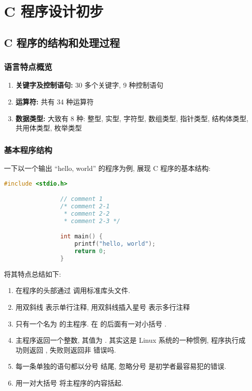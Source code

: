 \chapter{C 程序设计初步}
\section{C 程序的结构和处理过程}
    \subsection{语言特点概览}
        \begin{enumerate}
            \item \textbf{关键字及控制语句:} 30 多个关键字, 9 种控制语句
            \item \textbf{运算符:} 共有 34 种运算符
            \item \textbf{数据类型:} 大致有 8 种: 整型, 实型, 字符型, 数组类型, 指针类型, 结构体类型, 共用体类型, 枚举类型
        \end{enumerate}

    \subsection{基本程序结构}
        \hspace*{2em} 一下以一个输出 ``hello, world'' 的程序为例, 展现 C 程序的基本结构:
            \begin{lstlisting}[language = {C}, gobble = 16]
                #include <stdio.h>

                // comment 1
                /* comment 2-1
                 * comment 2-2
                 * comment 2-3 */

                int main() {
                    printf("hello, world");
                    return 0;
                }
            \end{lstlisting}

        将其特点总结如下:
            \begin{enumerate}
                \item 在程序的头部通过  调用标准库头文件.
                \item 用双斜线 \Code{//} 表示单行注释, 用双斜线插入星号 \Code{/**/} 表示多行注释
                \item 只有一个名为  的主程序. 在  的后面有一对小括号 \Code{()}.
                \item 主程序返回一个整数, 其值为 . 其实这是 Linux 系统的一种惯例, 程序执行成功则返回 , 失败则返回非  错误吗.
                \item 每一条单独的语句都以分号 \Code{;} 结尾, 忽略分号 \Code{;} 是初学者最容易犯的错误.
                \item 用一对大括号 \Code{\{\}} 将主程序的内容括起.
            \end{enumerate}

